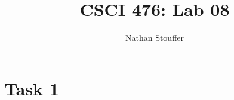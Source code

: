 \documentclass[11pt]{article}
\begin{document}
\title{CSCI 476: Lab 08}
\author{Nathan Stouffer}
\maketitle
\newpage

\section*{Task 1}
\end{document}
